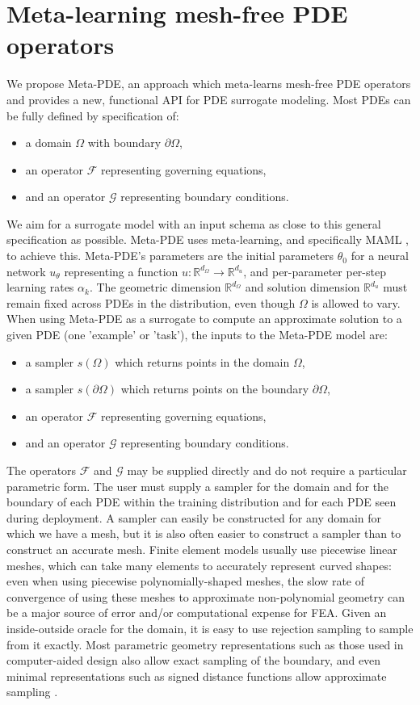 \section{Meta-learning mesh-free PDE operators}
We propose Meta-PDE, an approach which meta-learns mesh-free PDE operators and
provides a new, functional API for PDE surrogate modeling.
Most PDEs can be fully defined by specification of:
\begin{itemize}
  \item a domain $\Omega$ with boundary $\partial \Omega$,
  \item an operator $\mathcal{F}$ representing governing equations,
  \item and an operator $\mathcal{G}$ representing boundary conditions.
\end{itemize}
We aim for a surrogate model with an input schema as close to this general specification as possible.
Meta-PDE uses meta-learning, and specifically MAML \citep{}, to achieve this.
Meta-PDE's parameters are the initial parameters $\theta_0$ for a neural network
$u_\theta$ representing
a function $u: \mathbb{R}^{d_\Omega} \to \mathbb{R}^{d_u}$,
and per-parameter per-step learning rates $\alpha_k$.
The geometric dimension $\mathbb{R}^{d_\Omega}$ and solution dimension $\mathbb{R}^{d_u}$
must remain fixed across PDEs in the distribution, even though $\Omega$ is allowed to vary.
When using Meta-PDE as a surrogate to compute an approximate solution to a given PDE
(one 'example' or 'task'),
the inputs to the Meta-PDE model are:
\begin{itemize}
  \item a sampler $s(\Omega)$ which returns points in the domain $\Omega$,
  \item a sampler $s(\partial\Omega)$ which returns points on the boundary $\partial\Omega$,
  \item an operator $\mathcal{F}$ representing governing equations,
  \item and an operator $\mathcal{G}$ representing boundary conditions.
\end{itemize}

The operators $\mathcal{F}$ and $\mathcal{G}$ may be supplied directly and do not
require a particular parametric form.
The user must supply a sampler for the domain and for the boundary of each PDE within
the training distribution and for each PDE seen during deployment.
A sampler can easily be constructed for any domain for which we have a mesh,
but it is also often easier to construct a sampler than to construct an accurate mesh.
Finite element models usually use piecewise linear meshes, which can take many elements
to accurately represent curved shapes: even when using piecewise polynomially-shaped meshes,
the slow rate of convergence of using these meshes to approximate
non-polynomial geometry can be a major source of error and/or computational expense
for FEA.
Given an inside-outside oracle for the domain, it is easy to use rejection sampling
to sample from it exactly.
Most parametric geometry representations such as those used
in computer-aided design also allow exact sampling of the boundary, and even
minimal representations such as signed distance functions allow approximate
sampling \citep{brubaker2012family}.

